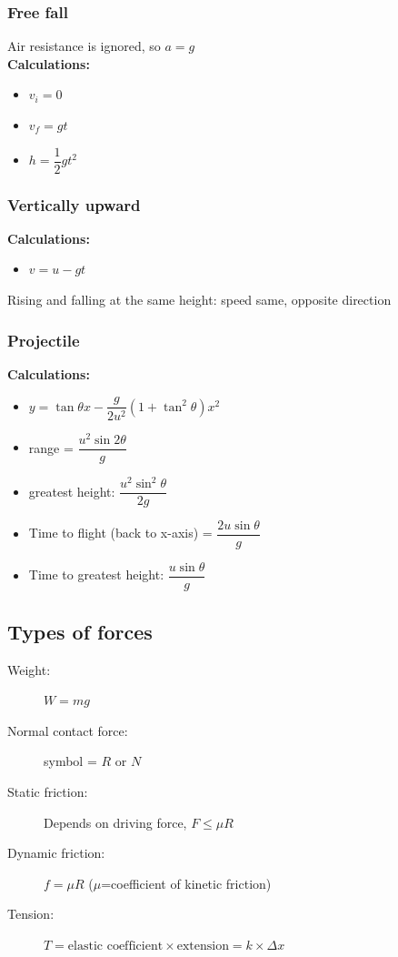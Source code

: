 \documentclass[A4paper]{article}
\begin{document}
	\subsubsection{Free fall}
	Air resistance is ignored, so $a=g$\\
	\textbf{Calculations:}
	\begin{itemize}
		\item $v_i = 0$
		\item $v_f = gt$
		\item $h=\dfrac{1}{2}gt^2$
	\end{itemize}
	\subsubsection{Vertically upward}
	\textbf{Calculations:}
	\begin{itemize}
		\item $v = u - gt$
	\end{itemize}
	Rising and falling at the same height: speed same, opposite direction
	\subsubsection{Projectile}
	\textbf{Calculations:}
	\begin{itemize}
		\item $y=\tan\theta x - \dfrac{g}{2u^2}(1+\tan^2\theta)x^2$
		\item range = $\dfrac{u^2\sin 2\theta}{g}$
		\item greatest height: $\dfrac{u^2\sin^2\theta}{2g}$
		\item Time to flight (back to x-axis) = $\dfrac{2u\sin\theta}{g}$
		\item Time to greatest height: $\dfrac{u\sin\theta}{g}$
	\end{itemize}
	\subsection{Types of forces}
	\begin{description}
		\item[Weight: ] $W=mg$
		\item[Normal contact force: ] symbol = $R$ or $N$
		\item[Static friction: ] Depends on driving force, $F\leq \mu R$
		\item[Dynamic friction: ] $f=\mu R$ ($\mu$=coefficient of kinetic friction)
		\item[Tension: ] $T=\text{elastic coefficient}\times\text{extension}=k\times\Delta x$
	\end{description}
	
\end{document}
